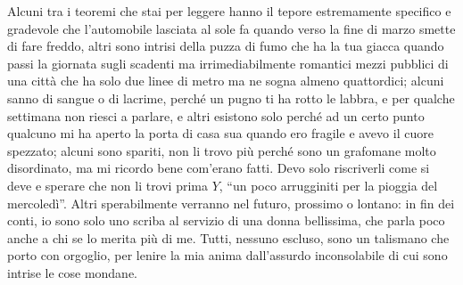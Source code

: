 Alcuni tra i teoremi che stai per leggere hanno il tepore estremamente specifico e gradevole che l'automobile lasciata al sole fa quando verso la fine di marzo smette di fare freddo, altri sono intrisi della puzza di fumo che ha la tua giacca quando passi la giornata sugli scadenti ma irrimediabilmente romantici mezzi pubblici di una città che ha solo due linee di metro ma ne sogna almeno quattordici; alcuni sanno di sangue o di lacrime, perché un pugno ti ha rotto le labbra, e per qualche settimana non riesci a parlare, e altri esistono solo perché ad un certo punto qualcuno mi ha aperto la porta di casa sua quando ero fragile e avevo il cuore spezzato; alcuni sono spariti, non li trovo più perché sono un grafomane molto disordinato, ma mi ricordo bene com'erano fatti. Devo solo riscriverli come si deve e sperare che non li trovi prima $Y$, ``un poco arrugginiti per la pioggia del mercoledì''. Altri sperabilmente verranno nel futuro, prossimo o lontano: in fin dei conti, io sono solo uno scriba al servizio di una donna bellissima, che parla poco anche a chi se lo merita più di me. Tutti, nessuno escluso, sono un talismano che porto con orgoglio, per lenire la mia anima dall'assurdo inconsolabile di cui sono intrise le cose mondane.

